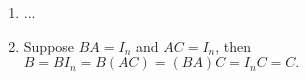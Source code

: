 {\color{solution}
\begin{enumerate}
	\item ...
	\item Suppose $BA = I_n$ and $AC = I_n$, then $B = BI_n =B(AC) = (BA)C=I_nC = C. $
\end{enumerate}
}
